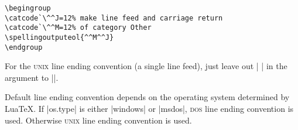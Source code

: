 \documentclass[11pt]{article}
\newcommand*{\acr}[1]{\mbox{\scshape#1}}
\begin{document}
\begin{lstlisting}[language={[LaTeX]TeX}]
\begingroup
\catcode`\^^J=12% make line feed and carriage return
\catcode`\^^M=12% of category Other
\spellingoutputeol{^^M^^J}
\endgroup
\end{lstlisting}
%
For the \acr{unix} line ending convention (a single line feed), just
leave out |^^M| in the argument to |\spellingoutputeol|.

Default line ending convention depends on the operating system
determined by Lua\TeX.  If |os.type| is either |windows| or |msdos|,
\acr{dos} line ending convention is used.  Otherwise \acr{unix} line
ending convention is used.
\end{document}

